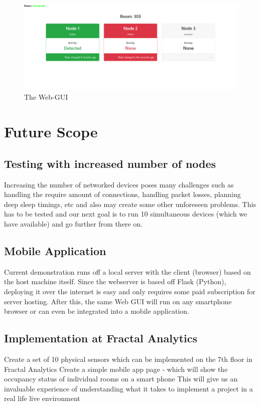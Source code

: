 \documentclass[journal]{IEEEtran}
\begin{document}
\begin{figure}[ht]
	\centering
	\includegraphics[scale=0.2]{Website1.PNG}
	\caption{The Web-GUI}
	\label{fig_print}
\end{figure}

\section{Future Scope}

\subsection{Testing with increased number of nodes}
Increasing the number of networked devices poses many challenges such as handling the require amount of connections, handling packet losses, planning deep sleep timings, etc and also may create some other unforeseen problems. This has to be tested and our next goal is to run 10 simultaneous devices (which we have available) and go further from there on.

\subsection{Mobile Application}
Current demonstration runs off a local server with the client (browser) based on the host machine itself. Since the webserver is based off Flask (Python), deploying it over the internet is easy and only requires some paid subscription for server hosting. After this, the same Web GUI will run on any smartphone browser or can even be integrated into a mobile application.      

\subsection{Implementation at Fractal Analytics}
Create a set of 10 physical sensors which can be implemented on the 7th floor in Fractal Analytics
Create a simple mobile app page - which will show the occupancy status of individual rooms on a smart phone
This will give us an invaluable experience of understanding what it takes to implement a project in a real life live environment
\end{document}
